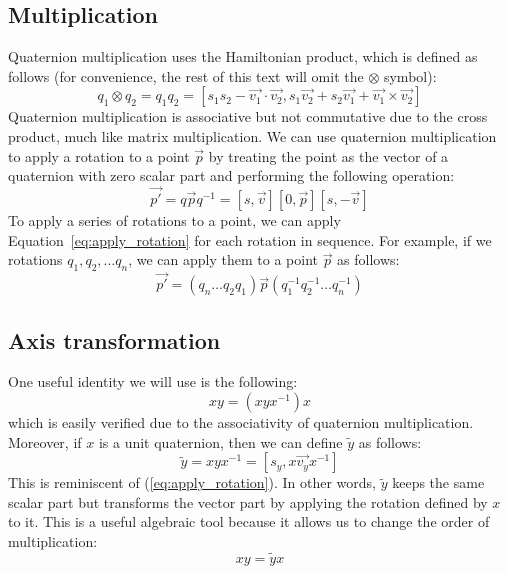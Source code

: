 \documentclass[11pt]{article}
\begin{document}
\subsection{Multiplication}
Quaternion multiplication uses the Hamiltonian product, which is defined as follows (for convenience, the rest of this text will omit the $\otimes$ symbol):
\begin{equation}\label{eq:quaternion_multiplication}
    q_1 \otimes q_2 = q_1 q_2 = [s_1 s_2 - \vec{v_1} \cdot \vec{v_2}, s_1 \vec{v_2} + s_2 \vec{v_1} + \vec{v_1} \times \vec{v_2}]
\end{equation}
Quaternion multiplication is associative but not commutative due to the cross product, much like matrix multiplication. We can use quaternion multiplication to apply a rotation to a point $\vec{p}$ by treating the point as the vector of a quaternion with zero scalar part and performing the following operation:
\begin{equation}\label{eq:apply_rotation}
    \vec{p'} = q \vec{p} q^{-1} = [s, \vec{v}] [0, \vec{p}] [s, -\vec{v}]
\end{equation}
To apply a series of rotations to a point, we can apply Equation~\ref{eq:apply_rotation} for each rotation in sequence. For example, if we rotations $q_1, q_2, \ldots q_n$, we can apply them to a point $\vec{p}$ as follows:
\begin{equation}
    \vec{p'} = (q_n \ldots q_2 q_1) \vec{p} (q_1^{-1} q_2^{-1} \ldots q_n^{-1})
\end{equation}

\subsection{Axis transformation}
One useful identity we will use is the following:
\begin{equation}
    x y = (x y x^{-1}) x
\end{equation}
which is easily verified due to the associativity of quaternion multiplication. Moreover, if $x$ is a unit quaternion, then we can define $\tilde{y}$ as follows:
\begin{equation}
    \tilde{y} = x y x^{-1} = [s_y, x \vec{v_y} x^{-1}]
\end{equation}
This is reminiscent of (\ref{eq:apply_rotation}). In other words, $\tilde{y}$ keeps the same scalar part but transforms the vector part by applying the rotation defined by $x$ to it. This is a useful algebraic tool because it allows us to change the order of multiplication:
\begin{equation}
    x y = \tilde{y} x
\end{equation}
\end{document}

